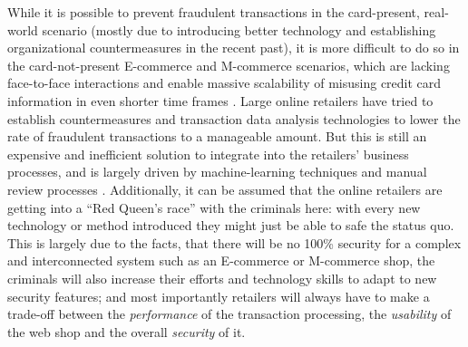 While it is possible to prevent fraudulent transactions in the card-present, real-world scenario (mostly due to introducing better technology and establishing organizational countermeasures in the recent past), it is more difficult to do so in the card-not-present \gls{E-commerce} and \gls{M-commerce} scenarios, which are lacking face-to-face interactions and enable massive scalability of misusing credit card information in even shorter time frames \citep{Lewis2015}. Large online retailers have tried to establish countermeasures and transaction data analysis technologies to lower the rate of fraudulent transactions to a manageable amount. But this is still an expensive and inefficient solution to integrate into the retailers’ business processes, and is largely driven by machine-learning techniques and manual review processes \citep{Brachmann2015}. Additionally, it can be assumed that the online retailers are getting into a ``Red Queen's race'' with the criminals here: with every new technology or method introduced they might just be able to safe the status quo. This is largely due to the facts, that there will be no 100\% security for a complex and interconnected system such as an \gls{E-commerce} or \gls{M-commerce} shop, the criminals will also increase their efforts and technology skills to adapt to new security features; and most importantly retailers will always have to make a trade-off between the \emph{performance} of the transaction processing, the \emph{usability} of the web shop and the overall \emph{security} of it.

